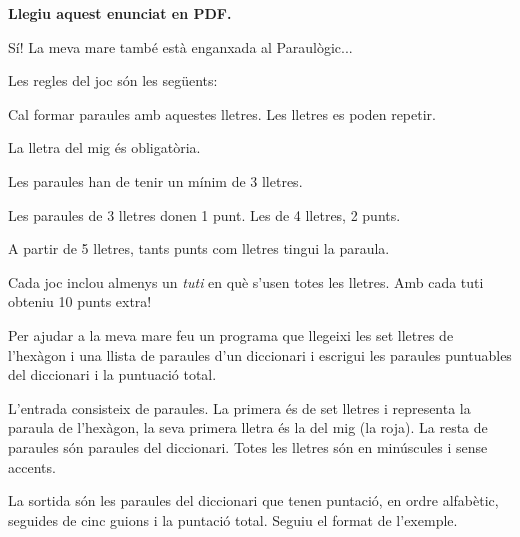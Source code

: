 

\Statement


\begin{htmlonly}
    \textbf{Llegiu aquest enunciat en PDF.}
\end{htmlonly}
    
Sí! La meva mare també està enganxada al Paraulògic...

\begin{latexonly}
\end{latexonly}

Les regles del joc són les següents:

\begin{itemize*}
    \item Cal formar paraules amb aquestes lletres. Les lletres es poden repetir.
    \item La lletra del mig és obligatòria.
    \item Les paraules han de tenir un mínim de 3 lletres.
    \item Les paraules de 3 lletres donen 1 punt. Les de 4 lletres, 2 punts.
    \item A partir de 5 lletres, tants punts com lletres tingui la paraula.
    \item Cada joc inclou almenys un \emph{tuti} en què s’usen totes les lletres. Amb cada tuti obteniu 10 punts extra!
\end{itemize*}

Per ajudar a la meva mare feu un programa que llegeixi les set lletres de l'hexàgon i una llista de paraules d'un diccionari i escrigui les paraules puntuables del diccionari i la puntuació total.

\Input

L'entrada consisteix de paraules. La primera és de set lletres i representa la paraula de l'hexàgon, la seva primera lletra és la del mig (la roja). La resta de paraules són paraules del diccionari. Totes les lletres són en minúscules i sense accents.

\Output

La sortida són les paraules del diccionari que tenen puntació, en ordre alfabètic, seguides de cinc guions i la puntació total. Seguiu el format de l'exemple.

\clearpage
\SampleTwoCol
